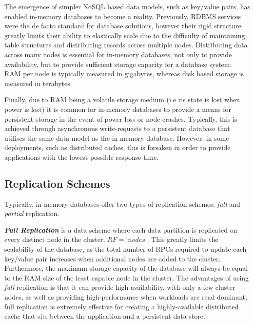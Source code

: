 The emergence of simpler NoSQL based data models, such as key/value pairs, has enabled in-memory databases to become a reality.  Previously, RDBMS services were the de facto standard for database solutions, however their rigid structure greatly limits their ability to elastically scale due to the difficulty of maintaining table structures and distributing records across multiple nodes\citep{Cattell:2011:SSN:1978915.1978919, Cooper:2010:BCS:1807128.1807152}. Distributing data across many nodes is essential for in-memory databases, not only to provide availability, but to provide sufficient storage capacity for a database system; RAM per node is typically measured in gigabytes, whereas disk based storage is measured in terabytes.  

Finally, due to RAM being a volatile storage medium (i.e its state is lost when power is lost) it is common for in-memory databases to provide a means for persistent storage in the event of power-loss or node crashes.  Typically, this is achieved through asynchronous write-requests to a persistent database that utilises the same data model as the in-memory database.  However, in some deployments, such as distributed caches, this is forsaken in order to provide applications with the lowest possible response time.  
    
    \subsection{Replication Schemes}\label{replication_schemes}
	Typically, in-memory databases offer two types of replication schemes: \emph{full} and \emph{partial} replication.  
	
	\textbf{\emph{Full Replication}} is a data scheme where each data partition is replicated on every distinct node in the cluster, $RF = \left\vert nodes \right\vert$.  This greatly limits the scalability of the database, as the total number of RPCs required to update each key/value pair increases when additional nodes are added to the cluster.  Furthermore, the maximum storage capacity of the database will always be equal to the RAM size of the least capable node in the cluster.  The advantages of using \emph{full} replication is that it can provide high availability, with only a few cluster nodes, as well as providing high-performance when workloads are read dominant; full replication is extremely effective for creating a highly-available distributed cache that sits between the application and a persistent data store.  
	
